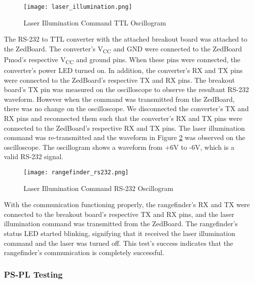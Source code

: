 \begin{figure}[H]
	\centerline{\texttt{[image: laser\_illumination.png]}}
	\caption{Laser Illumination Command TTL Oscillogram}
	\label{laser_illumination}
\end{figure}

The RS-232 to TTL converter with the attached breakout board was attached to the ZedBoard. The converter's V\textsubscript{CC} and GND were connected to the ZedBoard Pmod's respective V\textsubscript{CC} and ground pins. When these pins were connected, the converter's power LED turned on. In addition, the converter's RX and TX pins were connected to the ZedBoard's respective TX and RX pins. The breakout board's TX pin was measured on the oscilloscope to observe the resultant RS-232 waveform. However when the command was transmitted from the ZedBoard, there was no change on the oscilloscope. We disconnected the converter's TX and RX pins and reconnected them such that the converter's RX and TX pins were connected to the ZedBoard's respective RX and TX pins. The laser illumination command was re-transmitted and the waveform in Figure \ref{rangefinder_rs232} was observed on the oscilloscope. The oscillogram shows a waveform from +6V to -6V, which is a valid RS-232 signal.

\begin{figure}[H]
	\centerline{\texttt{[image: rangefinder\_rs232.png]}}
	\caption{Laser Illumination Command RS-232 Oscillogram}
	\label{rangefinder_rs232}
\end{figure}

With the communication functioning properly, the rangefinder's RX and TX were connected to the breakout board's respective TX and RX pins, and the laser illumination command was transmitted from the ZedBoard. The rangefinder's status LED started blinking, signifying that it received the laser illumination command and the laser was turned off. This test's success indicates that the rangefinder's communication is completely successful.

\subsubsection{PS-PL Testing}



